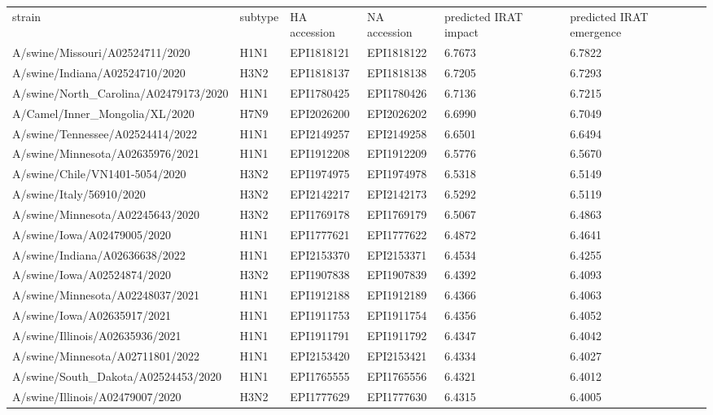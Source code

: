 \begin{tabular}{L{1.95in}|L{.25in}|L{.60in}|L{.6in}|C{1in}|C{1in}}\hline
strain&subtype& HA  accession & NA  accession & predicted  IRAT  impact & predicted  IRAT  emergence \\
 A/swine/Missouri/A02524711/2020 &H1N1&EPI1818121&EPI1818122&6.7673&6.7822\\
 A/swine/Indiana/A02524710/2020 &H3N2&EPI1818137&EPI1818138&6.7205&6.7293\\
 A/swine/North\_Carolina/A02479173/2020 &H1N1&EPI1780425&EPI1780426&6.7136&6.7215\\
 A/Camel/Inner\_Mongolia/XL/2020 &H7N9&EPI2026200&EPI2026202&6.6990&6.7049\\
 A/swine/Tennessee/A02524414/2022 &H1N1&EPI2149257&EPI2149258&6.6501&6.6494\\
 A/swine/Minnesota/A02635976/2021 &H1N1&EPI1912208&EPI1912209&6.5776&6.5670\\
 A/swine/Chile/VN1401-5054/2020 &H3N2&EPI1974975&EPI1974978&6.5318&6.5149\\
 A/swine/Italy/56910/2020 &H3N2&EPI2142217&EPI2142173&6.5292&6.5119\\
 A/swine/Minnesota/A02245643/2020 &H3N2&EPI1769178&EPI1769179&6.5067&6.4863\\
 A/swine/Iowa/A02479005/2020 &H1N1&EPI1777621&EPI1777622&6.4872&6.4641\\
 A/swine/Indiana/A02636638/2022 &H1N1&EPI2153370&EPI2153371&6.4534&6.4255\\
 A/swine/Iowa/A02524874/2020 &H3N2&EPI1907838&EPI1907839&6.4392&6.4093\\
 A/swine/Minnesota/A02248037/2021 &H1N1&EPI1912188&EPI1912189&6.4366&6.4063\\
 A/swine/Iowa/A02635917/2021 &H1N1&EPI1911753&EPI1911754&6.4356&6.4052\\
 A/swine/Illinois/A02635936/2021 &H1N1&EPI1911791&EPI1911792&6.4347&6.4042\\
 A/swine/Minnesota/A02711801/2022 &H1N1&EPI2153420&EPI2153421&6.4334&6.4027\\
 A/swine/South\_Dakota/A02524453/2020 &H1N1&EPI1765555&EPI1765556&6.4321&6.4012\\
 A/swine/Illinois/A02479007/2020 &H3N2&EPI1777629&EPI1777630&6.4315&6.4005\\

\end{tabular}
